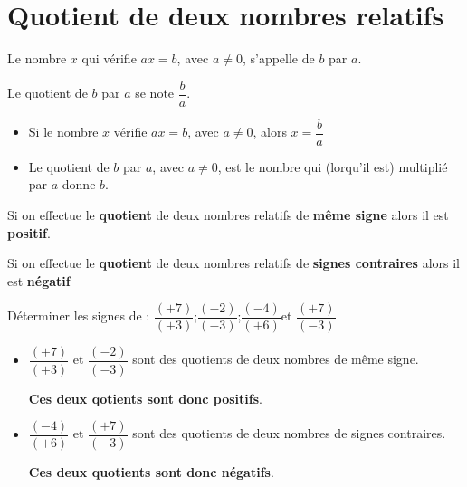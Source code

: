 \section{Quotient de deux nombres relatifs}

\begin{definition}
  Le nombre $x$ qui vérifie $ax=b$, avec $a\not=0$, s'appelle  de $b$ par $a$.
\end{definition}

\begin{notation}
  Le quotient de $b$ par $a$ se note $\dfrac{b}{a}$. 
\end{notation}

\begin{remarques}
  \begin{itemize}
    \item Si le nombre $x$ vérifie $ax=b$, avec $a\not=0$, alors $x=\dfrac{b}{a}$
    \item Le quotient de $b$ par $a$, avec $a\not=0$, est le nombre qui (lorqu'il est) multiplié par $a$ donne $b$.
  \end{itemize}  
\end{remarques}

\begin{propriete}
  Si on effectue le \textbf{quotient} de deux nombres relatifs de \textbf{m\^{e}me signe} alors il est \textbf{positif}.
\end{propriete}

\begin{propriete}
  Si on effectue le \textbf{quotient} de deux nombres relatifs de \textbf{signes contraires} alors il est \textbf{n\'egatif}
\end{propriete}

\begin{exemple*1}
  Déterminer les signes de : $\dfrac{(+7)}{(+3)}$\hfill ;\hfill$\dfrac{(-2)}{(-3)}$\hfill ;\hfill $\dfrac{(-4)}{(+6)}$\hfill et \hfill $\dfrac{(+7)}{(-3)}$
  \correction
  \begin{itemize}
    \item $\dfrac{(+7)}{(+3)}$ et $\dfrac{(-2)}{(-3)}$ sont des quotients de deux nombres de même signe.
    
    \textbf{Ces deux qotients sont donc positifs}.
    \item $\dfrac{(-4)}{(+6)}$ et $\dfrac{(+7)}{(-3)}$ sont des quotients de deux nombres de signes contraires.
    
    \textbf{Ces deux quotients sont donc négatifs}.
  \end{itemize}
\end{exemple*1}

